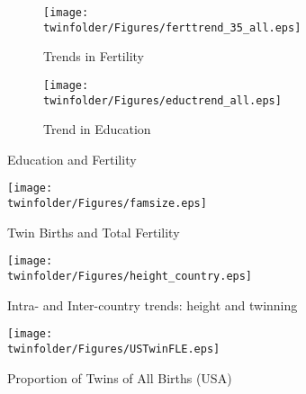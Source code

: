 \begin{figure}[htpb!]
\centering
\begin{subfigure}{.5\textwidth}
  \centering
  \texttt{[image: \\twinfolder/Figures/ferttrend\_35\_all.eps]}
  \caption{Trends in Fertility}
  \label{TWINfig:fertrend}
\end{subfigure}%
\begin{subfigure}{.5\textwidth}
  \centering
  \texttt{[image: \\twinfolder/Figures/eductrend\_all.eps]}
  \caption{Trend in Education}
  \label{TWINfig:eductrend}
\end{subfigure}
\caption{Education and Fertility}
\label{TWINfig:trends}
\end{figure}
\vspace{1cm}

\begin{figure}[htpb!]
\begin{center}
\caption{Twin Births and Total Fertility}
\label{TWINfig:births}
\texttt{[image: \\twinfolder/Figures/famsize.eps]} 
\end{center}
\end{figure}

\begin{figure}[htpb!]
\begin{center}
\caption{Intra- and Inter-country trends: height and twinning}
\label{TWINfig:arrows}
\texttt{[image: \\twinfolder/Figures/height\_country.eps]} 
\end{center}
\end{figure}

\begin{figure}[htpb!]
\begin{center}
\caption{Proportion of Twins of All Births (USA)}
\label{TWINfig:USTwin}
\texttt{[image: \\twinfolder/Figures/USTwinFLE.eps]} 
\end{center}
\end{figure}


